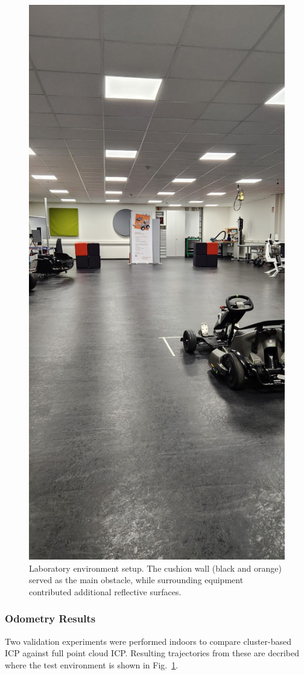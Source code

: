 \begin{figure}[!htbp]
    \centering
    \includegraphics[width=0.75\linewidth]{images/labSetup.png}
    \caption{Laboratory environment setup. The cushion wall (black and orange) served as the main obstacle, while surrounding equipment contributed additional reflective surfaces.}
    \label{fig:lab_setup}
\end{figure}

\subsubsection{Odometry Results}
Two validation experiments were performed indoors to compare cluster-based ICP against full point cloud ICP.
Resulting trajectories from these are decribed where the test environment is shown in Fig.~\ref{fig:lab_setup}.

